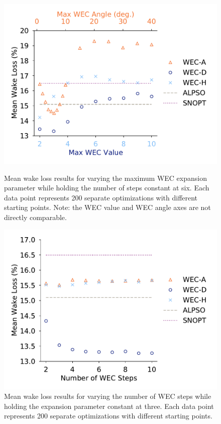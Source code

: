 \documentclass[a4paper]{jpconf}
\begin{document}
\begin{figure}[ht]
	\centering
	\begin{minipage}[t]{0.47\textwidth}
		\centering
		\includegraphics[width=\textwidth, trim={0cm 0cm 0cm 0cm}, clip]{tests/maxwec_const_nsteps6_mean}
		\caption{Mean wake loss results for varying the maximum WEC expansion parameter while holding the number of steps constant at six. Each data point represents 200 separate optimizations with different starting points. Note: the WEC value and WEC angle axes are not directly comparable.}
		\label{fig:aepmean-wm}
	\end{minipage}\hspace{1pc}
	\begin{minipage}[t]{0.47\textwidth}
		\centering
		\includegraphics[width=\textwidth]{tests/nsteps_const_maxwec_mean}
		\caption{Mean wake loss results for varying the number of WEC steps while holding the expansion parameter constant at three. Each data point represents 200 separate optimizations with different starting points.}
		\label{fig:aepmean-ws}
	\end{minipage}
\end{figure}
\end{document}
